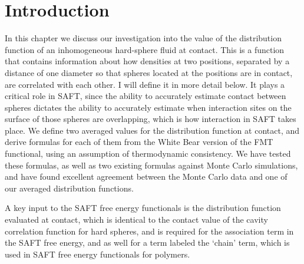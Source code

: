 \section{Introduction}
In this chapter we discuss our investigation into the value of the
distribution function of an inhomogeneous hard-sphere fluid at
contact.  This is a function that contains information about how
densities at two positions, separated by a distance of one diameter so
that spheres located at the positions are in contact, are correlated
with each other.  I will define it in more detail below.  It plays a
critical role in SAFT, since the %
ability to accurately estimate contact between spheres dictates the
ability to accurately estimate when interaction sites on the surface
of those spheres are overlapping, which is how interaction in SAFT
takes place.  We define two averaged values for the distribution
function at contact, and derive formulas for each of them from the
White Bear version of the FMT functional, using an assumption of
thermodynamic consistency. We have tested these formulas, as well as
two existing formulas against Monte Carlo simulations, and have found
excellent agreement between the Monte Carlo data and one of our
averaged distribution functions.


A key input to the SAFT free energy functionals is the distribution
function evaluated at contact, which is identical to the contact value
of the cavity correlation function for hard spheres, and is required
for the association term in the SAFT free energy, and as well for a
term labeled the `chain' term, which is used in SAFT free energy
functionals for polymers.


